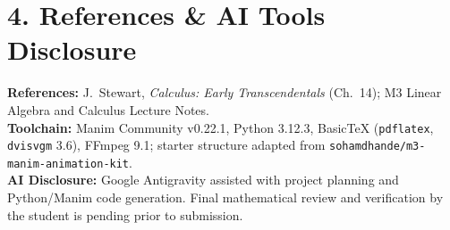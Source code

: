 \documentclass[10pt,a4paper]{article}
\begin{document}
\vspace{8pt}
\section*{\color{slate}4. References \& AI Tools Disclosure}
\textbf{References:} J.~Stewart, \textit{Calculus: Early Transcendentals} (Ch.~14); M3 Linear Algebra and Calculus Lecture Notes. \\
\textbf{Toolchain:} Manim Community v0.22.1, Python 3.12.3, BasicTeX (\texttt{pdflatex}, \texttt{dvisvgm} 3.6), FFmpeg 9.1; starter structure adapted from \texttt{sohamdhande/m3-manim-animation-kit}. \\
\textbf{AI Disclosure:} Google Antigravity assisted with project planning and Python/Manim code generation. Final mathematical review and verification by the student is pending prior to submission.
\end{document}

